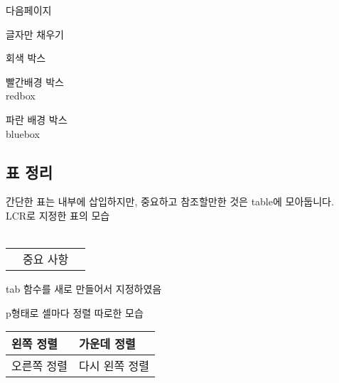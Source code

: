 다음페이지 \\
\newpage

글자만  채우기
\begin{graybox}
회색 박스
\end{graybox}

\begin{redbox}
빨간배경 박스 \\
redbox
\end{redbox}

\begin{bluebox}
파란 배경 박스 \\
bluebox
\end{bluebox}

\newpage
\subsection{표 정리}

간단한 표는 내부에 삽입하지만, 중요하고 참조할만한 것은 table에 모아둡니다. \\
LCR로 지정한 표의 모습 \\
\vspace{-1em} \\ %
\begin{tabular}{|L{3cm}|C{3cm}|R{5cm}|} %
\hline
{} &  &  \\
\hline
{} & 중요 사항 & \\
\hline
\end{tabular}

tab 함수를 새로 만들어서 지정하였음 \\

p형태로 셀마다 정렬 따로한 모습 \\
\vspace{-2.1em} %
\begin{center}
\begin{tabular}{|p{4cm}|p{4cm}|}
\hline
\raggedright 왼쪽 정렬 & \centering 가운데 정렬 \tabularnewline
\hline
\raggedleft 오른쪽 정렬 & \raggedright 다시 왼쪽 정렬 \tabularnewline
\hline
\end{tabular}
\end{center}

